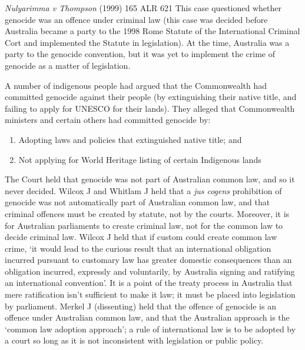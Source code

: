 \begin{casedetails}{\textit{Nulyarimma v Thompson} (1999) 165 ALR 621}
    \flushleft
    This case questioned whether genocide was an offence under criminal law (this case was decided before Australia became a party to the 1998 Rome Statute of the International Criminal Cort and implemented the Statute in legislation). At the time, Australia was a party to the genocide convention, but it was yet to implement the crime of genocide as a matter of legislation.

    \vspace{\baselineskip}

    A number of indigenous people had argued that the Commonwealth had committed genocide against their people (by extinguishing their native title, and failing to apply for UNESCO for their lands). They alleged that Commonwealth ministers and certain others had committed genocide by:
    \begin{enumerate}[label=(\alph*)]
        \item Adopting laws and policies that extinguished native title; and
        \item Not applying for World Heritage listing of certain Indigenous lands
    \end{enumerate}

    The Court held that genocide was not part of Australian common law, and so it never decided. Wilcox J and Whitlam J held that a \textit{jus cogens} prohibition of genocide was not automatically part of Australian common law, and that criminal offences must be created by statute, not by the courts. Moreover, it is for Australian parliaments to create criminal law, not for the common law to decide criminal law. Wilcox J held that if custom could create common law crime, `it would lead to the curious result that an international obligation incurred pursuant to customary law has greater domestic consequences than an obligation incurred, expressly and voluntarily, by Australia signing and ratifying an international convention'. It is a point of the treaty process in Australia that mere ratification isn't sufficient to make it law; it must be placed into legislation by parliament. Merkel J (dissenting) held that the offence of genocide is an offence under Australian common law, and that the Australian approach is the `common law adoption approach'; a rule of international law is to be adopted by a court so long as it is not inconsistent with legislation or public policy.
\end{casedetails}

